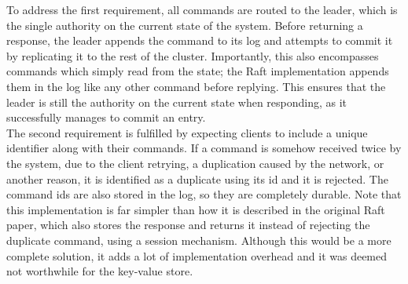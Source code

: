 To address the first requirement, all commands are routed to the leader, which is the single authority on the current state of the system. Before returning a response, the leader appends the command to its log and attempts to commit it by replicating it to the rest of the cluster. Importantly, this also encompasses commands which simply read from the state; the Raft implementation appends them in the log like any other command before replying. This ensures that the leader is still the authority on the current state when responding, as it successfully manages to commit an entry.\\

The second requirement is fulfilled by expecting clients to include a unique identifier along with their commands. If a command is somehow received twice by the system, due to the client retrying, a duplication caused by the network, or another reason, it is identified as a duplicate using its id and it is rejected. The command ids are also stored in the log, so they are completely durable. Note that this implementation is far simpler than how it is described in the original Raft paper, which also stores the response and returns it instead of rejecting the duplicate command, using a session mechanism. Although this would be a more complete solution, it adds a lot of implementation overhead and it was deemed not worthwhile for the key-value store.
